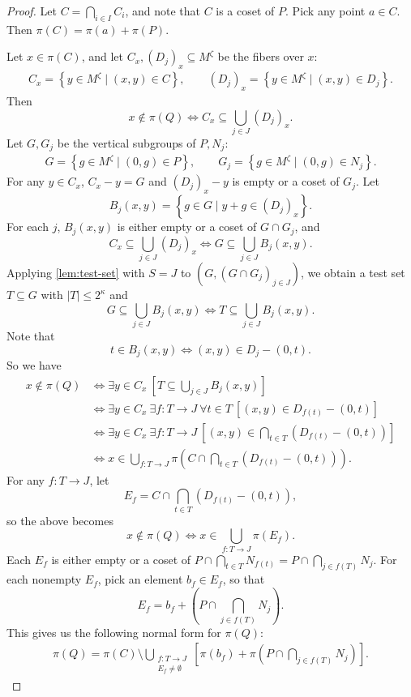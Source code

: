 \documentclass[10pt,a4paper]{amsart}
\newcommand{\set}[1]{\left\{#1\right\}}
\begin{document}
\begin{proof}
    Let $C = \bigcap_{i \in I} C_i$, and note that $C$ is a coset of $P$. 
    Pick any point $a \in C$. 
    Then $\pi(C) = \pi(a) + \pi(P)$.
    
    Let $x \in \pi(C)$, and let $C_x, (D_j)_x \subseteq M^\zeta$ be the fibers over $x$:
    \begin{align*}
        C_x  = \set{ y \in M^\zeta \mid (x,y) \in C }, \qquad
        (D_j)_x  = \set{ y \in M^\zeta \mid (x,y) \in D_j }.
    \end{align*}
    Then 
    \[
        x \not \in \pi(Q) \iff C_x \subseteq \bigcup_{j \in J} (D_j)_x.
    \]
    Let $G, G_j$ be the vertical subgroups of $P, N_j$:
    \begin{align*}
        G = \set{ g \in M^\zeta \mid (0,g) \in P }, \qquad
        G_j = \set{ g \in M^\zeta \mid (0,g) \in N_j }.
    \end{align*}
    For any $y \in C_x$, $C_x - y = G$ and $(D_j)_x - y$ is empty or a coset of $G_j$.
    Let 
    \[
        B_j(x,y) = \set{ g \in G \mid y + g \in (D_j)_x }.
    \]
    For each $j$, $B_j(x,y)$ is either empty or a coset of $G \cap G_j$, and
    \[
        C_x \subseteq \bigcup_{j \in J} (D_j)_x \iff G \subseteq \bigcup_{j \in J} B_j(x,y).
    \]
    Applying \cref{lem:test-set} with $S = J$ to $(G, (G \cap G_j)_{j \in J})$, we obtain a test set $T \subseteq G$ with $|T| \leq 2^\kappa$ and 
    \[ 
        G \subseteq \bigcup_{j \in J} B_j(x,y) \iff T \subseteq \bigcup_{j \in J} B_j(x,y). \]
    Note that 
    \[ 
        t \in B_j(x,y) \iff (x,y) \in D_j - (0,t).
    \]
    So we have
    \begin{align*}
        x \not \in \pi(Q) 
        & \iff \exists y \in C_x \ \left[ T \subseteq \bigcup_{j \in J} B_j(x,y) \right] \\
        & \iff \exists y \in C_x \ \exists f: T \to J \ \forall t \in T \ \left[ (x,y) \in D_{f(t)} - (0,t) \right] \\
        & \iff \exists y \in C_x \ \exists f: T \to J \ \left[ (x,y) \in \bigcap_{t \in T} (D_{f(t)} - (0,t)) \right] \\
        & \iff x \in \bigcup_{f: T \to J} \pi \! \left( C \cap \bigcap_{t \in T} (D_{f(t)} - (0,t)) \right).
    \end{align*}
    For any $f: T \to J$, let
    \[ E_f = C \cap \bigcap_{t \in T} (D_{f(t)} - (0,t)), \]
    so the above becomes
    \[
        x \not \in \pi(Q) \iff x \in \bigcup_{f: T \to J} \pi(E_f).
    \]
    Each $E_f$ is either empty or a coset of $P \cap \bigcap_{t \in T} N_{f(t)} = P \cap \bigcap_{j \in f(T)} N_j$.
    For each nonempty $E_f$, pick an element $b_f \in E_f$, so that 
    \[  
        E_f = b_f + \left( P \cap \bigcap_{j \in f(T)} N_j \right).
    \]
    This gives us the following normal form for $\pi(Q)$:
    \begin{align*}
        \pi(Q) = \pi(C) \setminus \bigcup_{\substack{f: T \to J \\ E_f \neq \emptyset}} \left[ \pi(b_f) + \pi\! \left( P \cap \bigcap_{j \in f(T)} N_j \right) \right].
    \end{align*}


\end{proof}
\end{document}
